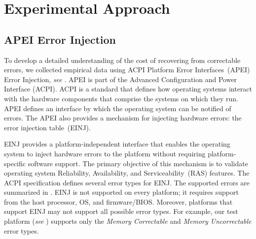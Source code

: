 
\section{Experimental Approach}
\label{sec:approach}

\subsection{APEI Error Injection}
To develop a detailed understanding of the cost of recovering from correctable 
errors, we collected empirical data using ACPI Platform Error Interfaces~(APEI) Error 
Injection, \emph{see} .  APEI is part of the 
Advanced Configuration and Power Interface (ACPI).  ACPI is a standard that defines how 
operating systems interact with the hardware components that comprise the systems on 
which they run.  APEI defines an interface by which the operating system can be notified 
of errors.  The APEI also provides a mechanism for injecting hardware errors: the error 
injection table~(EINJ).



EINJ provides a platform-independent interface that enables the operating system to
inject hardware errors to the platform without requiring platform-specific software 
support. The primary objective of this mechanism is to validate operating system 
Reliability, Availability, and Serviceability~(RAS) features.  The ACPI specification 
defines several error types for EINJ.  The supported errors are summarized in .  
EINJ is not supported on every platform; it requires support from the host processor, 
OS, and firmware/BIOS.  Moreover, platforms that support EINJ may not support all 
possible error types.  For example, our test platform (\emph{see} )
supports only the \emph{Memory Correctable} and \emph{Memory Uncorrectable} error types.

